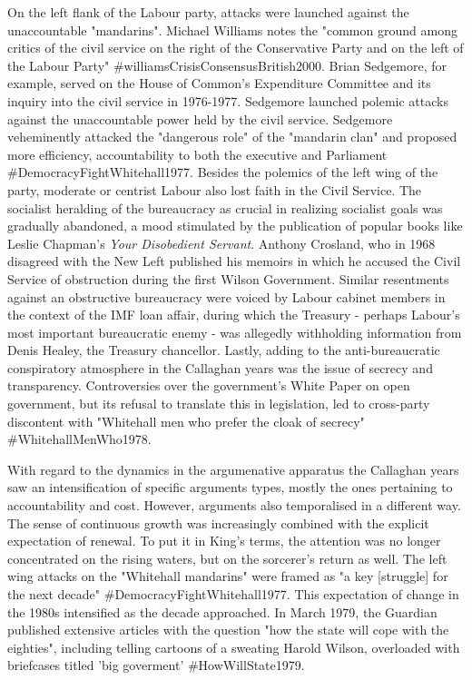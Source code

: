 \documentclass[
]{article}
\begin{document}
On the left flank of the Labour party, attacks were launched against the
unaccountable "mandarins". Michael Williams notes the "common ground
among critics of the civil service on the right of the Conservative
Party and on the left of the Labour Party"
\#williamsCrisisConsensusBritish2000. Brian Sedgemore, for example,
served on the House of Common's Expenditure Committee and its inquiry
into the civil service in 1976-1977. Sedgemore launched polemic attacks
against the unaccountable power held by the civil service. Sedgemore
veheminently attacked the "dangerous role" of the "mandarin clan" and
proposed more efficiency, accountability to both the executive and
Parliament \#DemocracyFightWhitehall1977. Besides the polemics of the
left wing of the party, moderate or centrist Labour also lost faith in
the Civil Service. The socialist heralding of the bureaucracy as crucial
in realizing socialist goals was gradually abandoned, a mood stimulated
by the publication of popular books like Leslie Chapman's \emph{Your
Disobedient Servant}. Anthony Crosland, who in 1968 disagreed with the
New Left published his memoirs in which he accused the Civil Service of
obstruction during the first Wilson Government. Similar resentments
against an obstructive bureaucracy were voiced by Labour cabinet members
in the context of the IMF loan affair, during which the Treasury -
perhaps Labour's most important bureaucratic enemy - was allegedly
withholding information from Denis Healey, the Treasury chancellor.
Lastly, adding to the anti-bureaucratic conspiratory atmosphere in the
Callaghan years was the issue of secrecy and transparency. Controversies
over the government's White Paper on open government, but its refusal to
translate this in legislation, led to cross-party discontent with
"Whitehall men who prefer the cloak of secrecy" \#WhitehallMenWho1978.

With regard to the dynamics in the argumenative apparatus the Callaghan
years saw an intensification of specific arguments types, mostly the
ones pertaining to accountability and cost. However, arguments also
temporalised in a different way. The sense of continuous growth was
increasingly combined with the explicit expectation of renewal. To put
it in King's terms, the attention was no longer concentrated on the
rising waters, but on the sorcerer's return as well. The left wing
attacks on the "Whitehall mandarins" were framed as "a key
{[}struggle{]} for the next decade" \#DemocracyFightWhitehall1977. This
expectation of change in the 1980s intensified as the decade approached.
In March 1979, the Guardian published extensive articles with the
question "how the state will cope with the eighties", including telling
cartoons of a sweating Harold Wilson, overloaded with briefcases titled
'big goverment' \#HowWillState1979.
\end{document}
